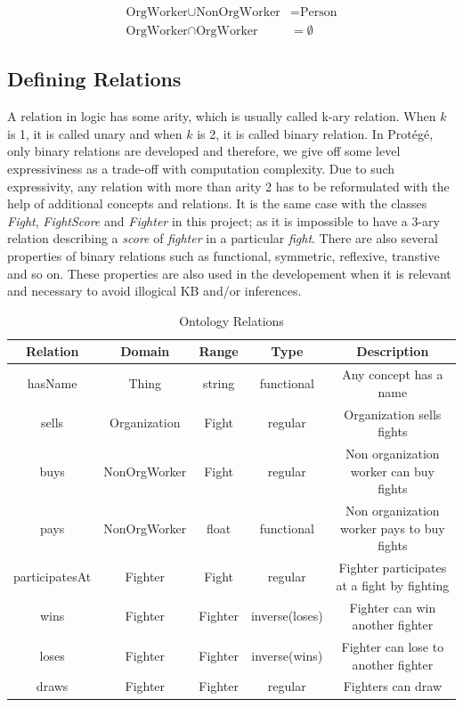 \documentclass[a4paper]{article}
\begin{document}
\begin{align}
	\text{OrgWorker} \cup \text{NonOrgWorker} &= \text{Person} \\
	\text{OrgWorker} \cap \text{OrgWorker} &= \emptyset
	\label{eq:class_axioms}
\end{align}

\subsection{Defining Relations}
A relation in logic has some arity, which is usually called k-ary relation. When $k$ is 1, it is called unary and when $k$ is 2, it is called binary relation. In Prot\'eg\'e, only binary relations are 
developed and therefore, we give off some level expressiviness as a trade-off with computation complexity. Due to such expressivity, any relation with more than arity 2 has to be reformulated with the 
help of additional concepts and relations. It is the same case with the classes \textit{Fight}, \textit{FightScore} and \textit{Fighter} in this project; as it is impossible to have a 3-ary relation 
describing a \textit{score} of \textit{fighter} in a particular \textit{fight}. There are also several properties of binary relations such as functional, symmetric, reflexive, transtive and so on. 
These properties are also used in the developement when it is relevant and necessary to avoid illogical KB and/or inferences.

\begin{table}[H]
	\centering
	\begin{tabular}{|c|c|c|c|c|}
		\hline
		\textbf{Relation} & \textbf{Domain} & \textbf{Range} & \textbf{Type} & \textbf{Description} \\
		\hline
		hasName & Thing & string & functional & Any concept has a name \\
		\hline
		sells & Organization & Fight & regular & Organization sells fights \\
		\hline
		buys & NonOrgWorker & Fight & regular & Non organization worker can buy fights \\
		\hline
		pays & NonOrgWorker & float & functional & Non organization worker pays to buy fights \\
		\hline
		participatesAt & Fighter & Fight & regular & Fighter participates at a fight by fighting \\
		\hline
		wins & Fighter & Fighter & inverse(loses) & Fighter can win another fighter \\
		\hline
		loses & Fighter & Fighter & inverse(wins) & Fighter can lose to another fighter \\
		\hline
		draws & Fighter & Fighter & regular & Fighters can draw \\
		\hline
	\end{tabular}
	\caption{Ontology Relations}
	\label{tab:relations}
\end{table}
\end{document}
